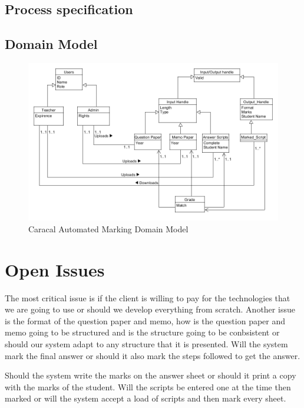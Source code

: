 \documentclass{article}
\begin{document}
	\subsection{Process specification}
	\subsection{Domain Model}
	\begin{figure}[h]
	\includegraphics[width=\linewidth]{Domain_Model.png}
	\caption{Caracal Automated Marking Domain Model}
\end{figure}
	
\section{Open Issues}
	 The most critical issue is if the client is willing to pay for the technologies that we are going to use or should we develop everything from scratch. Another issue is the format of the question paper and memo, how is the question paper and memo going to be structured and is the structure going to be conbsistent or should our system adapt to any structure that it is presented. Will the system mark the final answer or should it also mark the steps followed to get the answer. \par
	 Should the system write the marks on the answer sheet or should it print a copy with the marks of the student. Will the scripts be entered one at the time then marked or will the system accept a load of scripts and then mark every sheet. 
\end{document}
